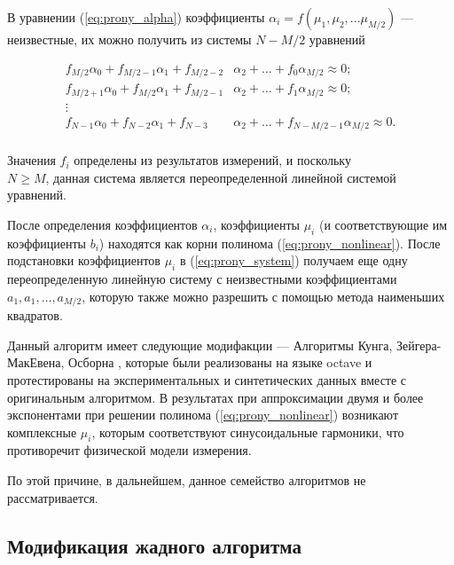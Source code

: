 В уравнении (\ref{eq:prony_alpha}) коэффициенты $\alpha_i = f (\mu_1, \mu_2, ... \mu_{M/2} )$  
--- неизвестные, их можно получить из системы $ N - M/2 $ уравнений

\begin{equation}
  \begin{split}
  f_{M/2} \alpha_0 + f_{M/2-1} \alpha_1 + f_{M/2-2} & \alpha_2 + \ldots + f_0 \alpha_{M/2} \approx 0;  \\
  f_{M/2+1} \alpha_0 + f_{M/2} \alpha_1 + f_{M/2-1} & \alpha_2 + \ldots + f_1 \alpha_{M/2} \approx 0; \\
  \vdots & \\
  f_{N-1} \alpha_0 + f_{N-2} \alpha_1 + f_{N-3} & \alpha_2 + \ldots + f_{N-M/2-1} \alpha_{M/2} \approx 0.  \\
  \end{split}
  \label{eq:prony_system2}
\end{equation}

Значения $f_i$ определены из результатов измерений, и поскольку \\ $N \geq M$, данная система является переопределенной линейной системой уравнений.


После определения коэффициентов $\alpha_i$, коэффициенты $\mu_i$ (и соответствующие им коэффициенты $b_i$) находятся
 как корни полинома (\ref{eq:prony_nonlinear}). После подстановки коэффициентов $\mu_i$ в (\ref{eq:prony_system}) получаем еще одну переопределенную линейную систему с неизвестными коэффициентами $a_1, a_1, \ldots, a_{M/2}$, которую
 также можно разрешить с помощью метода наименьших квадратов.  


Данный алгоритм имеет следующие модифакции --- Алгоритмы Кунга, Зейгера-МакЕвена, Осборна \cite{kung, zeiger, osborn}, которые были реализованы на языке octave и протестированы на экспериментальных и синтетических данных вместе с оригинальным алгоритмом. В результатах при аппроксимации двумя и более экспонентами при решении полинома (\ref{eq:prony_nonlinear}) возникают комплексные $\mu_i$, которым соответствуют синусоидальные гармоники, что противоречит физической модели измерения. 

По этой причине, в дальнейшем, данное семейство алгоритмов не рассматривается.




\subsection{Модификация жадного алгоритма}\label{subsect2_3_4}


